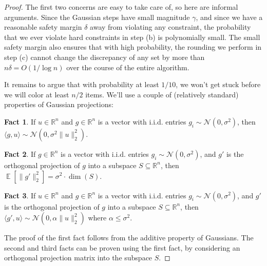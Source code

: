 \documentclass{article}
\theoremstyle{theorem}
\theoremstyle{definition}
\newtheorem{fact}{Fact}
\newcommand{\R}{\mathbb{R}}
\newcommand{\iprod}[1]{\langle #1 \rangle}
\newcommand{\E}{\mathop{\mathbb{E}}}
\newcommand{\cN}{\mathcal{N}}
\begin{document}
\begin{proof}
The first two concerns are easy to take care of, so here are informal arguments.
Since the Gaussian steps have small magnitude $\gamma$, and since we have a reasonable safety margin $\delta$ away from violating any constraint, the probability that we ever violate hard constraints in step (b) is polynomially small.
The small safety margin also ensures that with high probability, the rounding we perform in step (c) cannot change the discrepancy of any set by more than $n\delta = O(1/\log n)$ over the course of the entire algorithm.

It remains to argue that with probability at least $1/10$, we won't get stuck before we will color at least $n/2$ items.
    We'll use a couple of (relatively standard) properties of Gaussian projections:
    \begin{fact}\label{f1}
	If $u\in \R^n$ and $g\in \R^n$ is a vector with i.i.d. entries $g_i \sim \cN(0,\sigma^2)$, then $\iprod{g,u}\sim \cN(0,\sigma^2\|u\|_2^2)$.
\end{fact}

    \begin{fact}\label{f2}
	If $g\in \R^n$ is a vector with i.i.d. entries $g_i \sim \cN(0,\sigma^2)$, and $g'$ is the orthogonal projection of $g$ into a subspace $S \subseteq \R^n$, then
$\E[\|g'\|_2^2] = \sigma^2\cdot \dim(S)$.
\end{fact}

    \begin{fact}\label{f3}
	If $u\in \R^n$ and $g\in \R^n$ is a vector with i.i.d. entries $g_i\sim\cN(0,\sigma^2)$, and $g'$ is the orthogonal projection of $g$ into a subspace $S \subseteq \R^n$, then
$\iprod{g',u}\sim \cN(0,\alpha\|u\|_2^2)$ where $\alpha \le \sigma^2$.
    \end{fact}
The proof of the first fact follows from the additive property of Gaussians.
The second and third facts can be proven using the first fact, by considering an orthogonal projection matrix into the subspace $S$.

\medskip


\end{proof}
\end{document}

